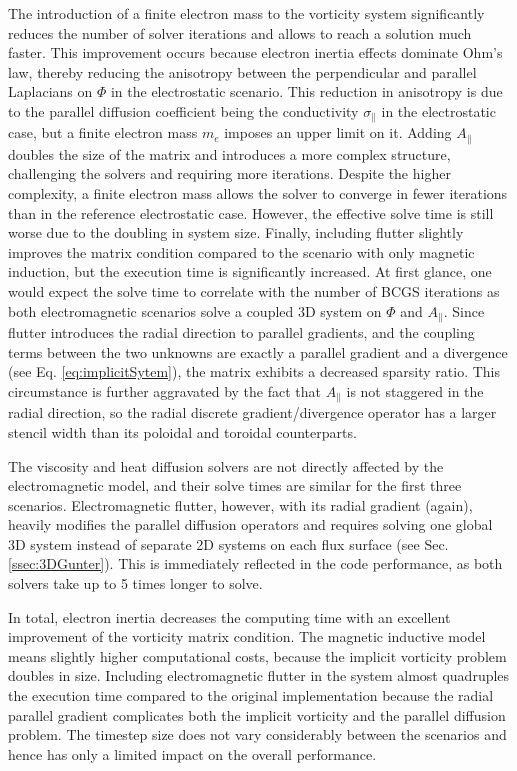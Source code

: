 The introduction of a finite electron mass to the vorticity system significantly reduces the number of solver iterations and allows to reach a solution much faster. This improvement occurs because electron inertia effects dominate Ohm's law, thereby reducing the anisotropy between the perpendicular and parallel Laplacians on $\Phi$ in the electrostatic scenario. This reduction in anisotropy is due to the parallel diffusion coefficient being the conductivity $\sigma_\parallel$ in the electrostatic case, but a finite electron mass $m_e$ imposes an upper limit on it. Adding $A_\parallel$ doubles the size of the matrix and introduces a more complex structure, challenging the solvers and requiring more iterations. Despite the higher complexity, a finite electron mass allows the solver to converge in fewer iterations than in the reference electrostatic case. However, the effective solve time is still worse due to the doubling in system size. Finally, including flutter slightly improves the matrix condition compared to the scenario with only magnetic induction, but the execution time is significantly increased. At first glance, one would expect the solve time to correlate with the number of BCGS iterations as both electromagnetic scenarios solve a coupled 3D system on $\Phi$ and $A_\parallel$. Since flutter introduces the radial direction to parallel gradients, and the coupling terms between the two unknowns are exactly a parallel gradient and a divergence (see Eq. \ref{eq:implicitSytem}), the matrix exhibits a decreased sparsity ratio. This circumstance is further aggravated by the fact that $A_\parallel$ is not staggered in the radial direction, so the radial discrete gradient/divergence operator has a larger stencil width than its poloidal and toroidal counterparts. \newline

The viscosity and heat diffusion solvers are not directly affected by the electromagnetic model, and their solve times are similar for the first three scenarios. Electromagnetic flutter, however, with its radial gradient (again), heavily modifies the parallel diffusion operators and requires solving one global 3D system instead of separate 2D systems on each flux surface (see Sec. \ref{ssec:3DGunter}). This is immediately reflected in the code performance, as both solvers take up to 5 times longer to solve. \newline

In total, electron inertia decreases the computing time with an excellent improvement of the vorticity matrix condition. The magnetic inductive model means slightly higher computational costs, because the implicit vorticity problem doubles in size. Including electromagnetic flutter in the system almost quadruples the execution time compared to the original implementation because the radial parallel gradient complicates both the implicit vorticity and the parallel diffusion problem. The timestep size does not vary considerably between the scenarios and hence has only a limited impact on the overall performance.

